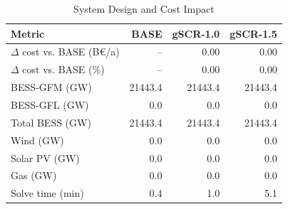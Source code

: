 \begin{table}[!t]
\centering
\caption{System Design and Cost Impact}
\label{tab:system_design}
\renewcommand{\arraystretch}{1.08}
\begin{tabular}{lrrr}
\toprule
Metric & BASE & gSCR-1.0 & gSCR-1.5 \\
\midrule
\(\Delta\) cost vs. BASE (B\euro/a) & -- & 0.00 & 0.00 \\
\(\Delta\) cost vs. BASE (\%)       & -- & 0.00 & 0.00 \\
BESS-GFM (GW)                       & 21443.4 & 21443.4 & 21443.4 \\
BESS-GFL (GW)                       & 0.0 & 0.0 & 0.0 \\
Total BESS (GW)                     & 21443.4 & 21443.4 & 21443.4 \\
Wind (GW)                           & 0.0 & 0.0 & 0.0 \\
Solar PV (GW)                       & 0.0 & 0.0 & 0.0 \\
Gas (GW)                            & 0.0 & 0.0 & 0.0 \\
Solve time (min)                    & 0.4 & 1.0 & 5.1 \\
\bottomrule
\end{tabular}
\end{table}
